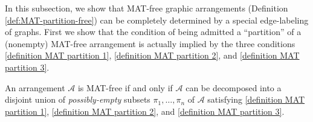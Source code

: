 \documentclass[ALCO, Unicode,published]{cedram}
\begin{document}
In this subsection, we show that MAT-free graphic arrangements (Definition \ref{def:MAT-partition-free}) can be completely determined by a  special edge-labeling of graphs. 
First we show that the condition of being admitted a ``partition'' of a (nonempty) MAT-free arrangement is actually implied by the three conditions \ref{definition MAT partition 1}, \ref{definition MAT partition 2}, and \ref{definition MAT partition 3}. 
\begin{proposition}\label{no internal empty block}
An arrangement $ \mathcal{A} $ is MAT-free if and only if $ \mathcal{A} $ can be decomposed into a disjoint union of \emph{possibly-empty} subsets $ \pi_{1}, \dots, \pi_{n} $ of $ \mathcal{A} $ satisfying \ref{definition MAT partition 1}, \ref{definition MAT partition 2}, and \ref{definition MAT partition 3}. 
\end{proposition}
\end{document}
